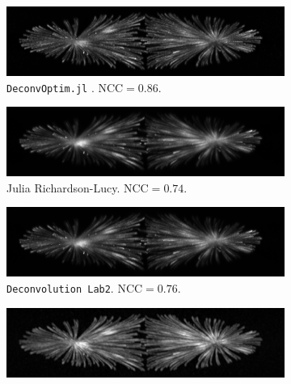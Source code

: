 \documentclass{juliacon}
\begin{document}
        \begin{figure}[h]
            \centering
            \begin{subfigure}{.3\textwidth}
                \centering
                \includegraphics[width=\textwidth]{figures/MIPs/mip_DeconvOptim.png}
                \caption{\texttt{DeconvOptim.jl} . $\text{NCC}= 0.86$.}
            \end{subfigure}
            \begin{subfigure}{.3\textwidth}
                \centering
                \includegraphics[width=\textwidth]{figures/MIPs/mip_DeconvOptim_RL.png}
                \caption{Julia Richardson-Lucy. $\text{NCC}= 0.74$.}
            \end{subfigure}
            \begin{subfigure}{.3\textwidth}
                \centering
                \includegraphics[width=\textwidth]{figures/MIPs/mip_DeconvolutionLab2.png}
                \caption{\texttt{Deconvolution Lab2}. $\text{NCC}= 0.76$.}
            \end{subfigure}
            \begin{subfigure}{.3\textwidth}
                \centering
                \includegraphics[width=\textwidth]{figures/MIPs/mip_ThreeDeconv.png}

\end{subfigure}
\end{figure}
\end{document}
